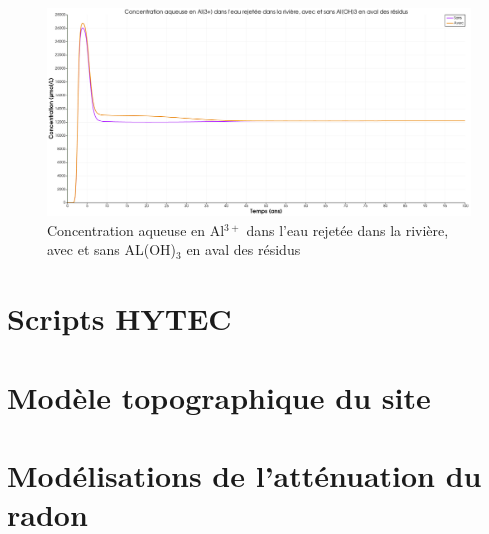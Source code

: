 \documentclass{article}
\begin{document}
\begin{figure}[H]
    \centering
    \includegraphics[width=0.5\linewidth]{III_B_2_24.png}
    \caption{Concentration aqueuse en Al$^{3+}$ dans l'eau rejetée dans la rivière, avec et sans AL(OH)$_3$ en aval des résidus}
    \label{fig:Al_riviere_comparaison_Al}
\end{figure}

\renewcommand\lstlistingname{Script n°}
\renewcommand\lstlistlistingname{}

\newpage
\section{Scripts HYTEC}
\label{lst:modele_hydro_chimie_final}

\newpage

\newpage



\newpage
\section{Modèle topographique du site}

\label{lst:modele_topo}

\newpage
\section{Modélisations de l'atténuation du radon}
\label{lst:modele_radon_1_1}


\newpage
\label{lst:modele_radon_1_2}



\newpage
\label{lst:modele_radon_2}

\end{document}
